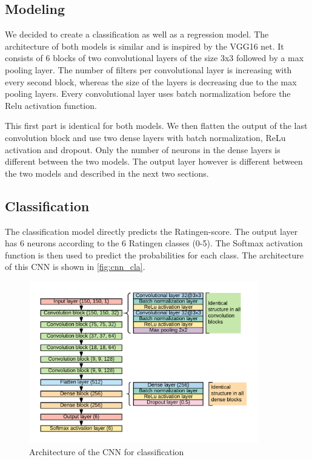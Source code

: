 \documentclass[12pt]{article}
\begin{document}
\subsection{Modeling}

We decided to create a classification as well as a regression model. The architecture of both models is similar and is inspired by the VGG16 net. It consists of 6 blocks of two convolutional layers of the size 3x3 followed by a max pooling layer. The number of filters per convolutional layer is increasing with every second block, whereas the size of the layers is decreasing due to the max pooling layers. Every convolutional layer uses batch normalization before the Relu activation function.

This first part is identical for both models. We then flatten the output of the last convolution block and use two dense layers with batch normalization, ReLu activation and dropout. Only the number of neurons in the dense layers is different between the two models. The output layer however is different between the two models and described in the next two sections.

\subsection{Classification}
\label{subsec:clas}

The classification model directly predicts the Ratingen-score. The output layer has 6 neurons according to the 6 Ratingen classes (0-5). The Softmax activation function is then used to predict the probabilities for each class. The architecture of this CNN is shown in \autoref{fig:cnn_cla}.

\begin{figure}[ht]
\includegraphics[width=10cm]{cnn_classification}	
\caption{Architecture of the CNN for classification}
\label{fig:cnn_cla}
\end{figure}
\end{document}
